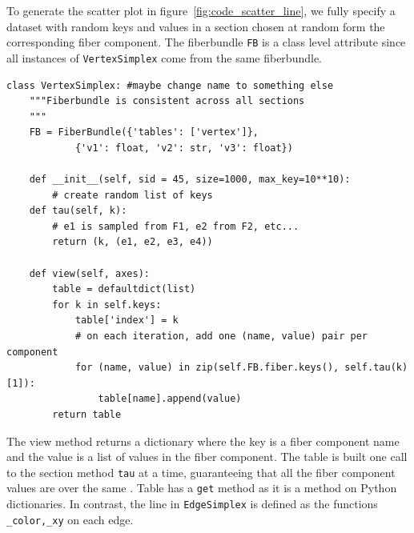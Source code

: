 \documentclass[../main.tex]{subfiles}
\begin{document}
To generate the scatter plot in figure~\ref{fig:code_scatter_line}, we fully specify a dataset with random keys and values in a section chosen at random form the corresponding fiber component. The fiberbundle \texttt{FB} is a class level attribute since all instances of \texttt{VertexSimplex} come from the same fiberbundle.
\begin{verbatim}
class VertexSimplex: #maybe change name to something else
    """Fiberbundle is consistent across all sections
    """
    FB = FiberBundle({'tables': ['vertex']},  
            {'v1': float, 'v2': str, 'v3': float})

    def __init__(self, sid = 45, size=1000, max_key=10**10):
        # create random list of keys
    def tau(self, k):
        # e1 is sampled from F1, e2 from F2, etc...
        return (k, (e1, e2, e3, e4))

    def view(self, axes):
        table = defaultdict(list)
        for k in self.keys:
            table['index'] = k
            # on each iteration, add one (name, value) pair per component
            for (name, value) in zip(self.FB.fiber.keys(), self.tau(k)[1]):
                table[name].append(value)
        return table
\end{verbatim}
The view method returns a dictionary where the key is a fiber component name and the value is a list of values in the fiber component. The table is built one call to the section method \texttt{tau} at a time, guaranteeing that all the fiber component values are over the same \dbasepoint. Table has a \texttt{get} method as it is a method on Python dictionaries. In contrast, the line in \texttt{EdgeSimplex} is defined as the functions \texttt{_color,_xy} on each edge. 
\end{document}

